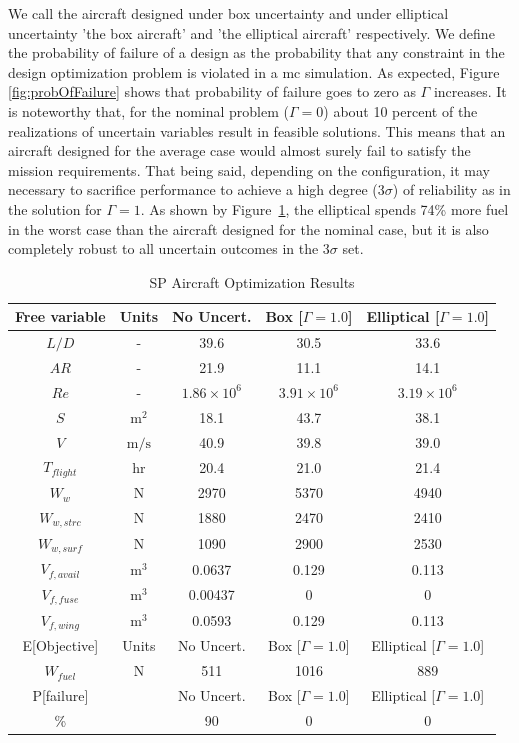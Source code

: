We call the aircraft designed under box uncertainty and under elliptical uncertainty 'the box aircraft'
and 'the elliptical aircraft' respectively. We
define the probability of failure of a design as the probability that any constraint
in the design optimization problem is violated in a \gls{mc} simulation.
As expected, Figure \ref{fig:probOfFailure} shows that probability of failure goes to zero as $\Gamma$ increases.
It is noteworthy that, for the nominal problem ($\Gamma = 0$) about 10 percent of the realizations of
uncertain variables result in feasible solutions.
This means that an aircraft designed for the average case would almost surely
fail to satisfy the mission requirements.
That being said, depending on the configuration, it may necessary to sacrifice
performance to achieve a high degree ($3\sigma$) of
reliability as in the solution for $\Gamma = 1$. As shown by Figure~\ref{tab:results},
the elliptical spends 74\% more fuel
in the worst case than the aircraft designed for the nominal case, but it
is also completely robust to all uncertain outcomes in the $3\sigma$ set.

\begin{table}[!h]
\begin{center}
\caption{\label{tab:results} SP Aircraft Optimization Results}
\begin{tabular}{c c c c c}
\hline
Free variable & Units & No Uncert. & Box [$\Gamma = 1.0$] & Elliptical [$\Gamma = 1.0$] \\
\hline
$L/D$ & - & 39.6 & 30.5 & 33.6 \\
$AR$ & - & 21.9 & 11.1 & 14.1 \\
$Re$ & - & $1.86 \times 10^6$ & $3.91\times 10^6$ & $3.19 \times 10^6$ \\
$S$ & $\mathrm{m^2}$ & 18.1 & 43.7 & 38.1 \\
$V$ & $\mathrm{m/s}$ & 40.9 & 39.8 & 39.0 \\
$T_{flight}$ & $\mathrm{hr}$ & 20.4 & 21.0 & 21.4 \\
$W_w$ & $\mathrm{N}$ & 2970 & 5370 & 4940 \\
$W_{w,strc}$ & $\mathrm{N}$ & 1880 & 2470 & 2410 \\
$W_{w,surf}$ & $\mathrm{N}$ & 1090 & 2900 & 2530 \\
$V_{f,avail}$ & $\mathrm{m^3}$ & 0.0637 & 0.129 & 0.113 \\
$V_{f,fuse}$ & $\mathrm{m^3}$ & 0.00437 & 0 & 0 \\
$V_{f,wing}$ & $\mathrm{m^3}$ & 0.0593 & 0.129 & 0.113 \\
\hline
E[Objective] & Units & No Uncert. & Box [$\Gamma = 1.0$] & Elliptical [$\Gamma = 1.0$] \\
\hline
$W_{fuel}$ & $\mathrm{N}$ & 511 & 1016 & 889 \\
\hline
P[failure] & & No Uncert. & Box [$\Gamma = 1.0$] & Elliptical [$\Gamma = 1.0$] \\
\hline
\% & & 90 & 0 & 0\\
\hline
\end{tabular}
\end{center}
\end{table}

